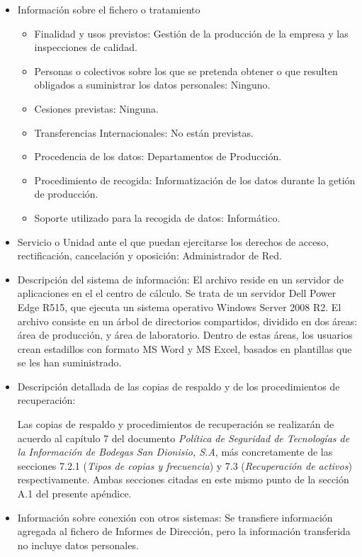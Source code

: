 \documentclass[a4paper,11pt,bibtotoc,noliststotoc]{scrbook}
\begin{document}
\begin{itemize}
\item Información sobre el fichero o tratamiento
	\begin{itemize}
	\item Finalidad y usos previstos: Gestión de la producción de la empresa y las inspecciones de calidad.
	\item Personas o colectivos sobre los que se pretenda obtener o que resulten obligados a suministrar los datos personales: Ninguno.
	\item Cesiones previstas: Ninguna.
	\item Transferencias Internacionales: No están previstas.
	\item Procedencia de los datos: Departamentos de Producción.
	\item Procedimiento de recogida: Informatización de los datos durante la getión de producción.
	\item Soporte utilizado para la recogida de datos: Informático.
	\end{itemize}

\item Servicio o Unidad ante el que puedan ejercitarse los derechos de acceso, rectificación, cancelación y oposición: Administrador de Red.

\item Descripción del sistema de información: El archivo reside en un servidor de aplicaciones en el el centro de cálculo. Se trata de un servidor Dell Power Edge R515, que ejecuta un sistema operativo Windows Server 2008 R2. El archivo consiste en un árbol de directorios compartidos, dividido en dos áreas: área de producción, y área de laboratorio. Dentro de estas áreas, los usuarios crean estadillos con formato MS Word y MS Excel, basados en plantillas que se les han suministrado.

\item Descripción detallada de las copias de respaldo y de los procedimientos de recuperación:

Las copias de respaldo y procedimientos de recuperación se realizarán de acuerdo al capítulo 7 del documento \emph{Política de Seguridad de Tecnologías de la Información de Bodegas San Dionisio, S.A}, más concretamente de las secciones 7.2.1 (\emph{Tipos de copias y frecuencia}) y 7.3 (\emph{Recuperación de activos}) respectivamente. Ambas secciones citadas en este mismo punto de la sección A.1 del presente apéndice.

\item Información sobre conexión con otros sistemas: Se transfiere información agregada al fichero de Informes de Dirección, pero la información transferida no incluye datos personales.


\end{itemize}
\end{document}
